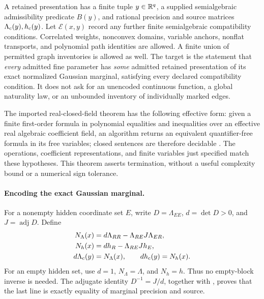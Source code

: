 A retained presentation has a finite tuple \(y\in\mathbb R^q\), a supplied
semialgebraic admissibility predicate \(B(y)\), and rational precision and
source matrices \(\Lambda_{\rm c}(y),h_{\rm c}(y)\). Let \(\mathcal E(x,y)\)
record any further finite semialgebraic compatibility conditions.
Correlated weights, nonconvex domains, variable anchors, nonflat
transports, and polynomial path identities are allowed. A finite union
of permitted graph inventories is allowed as well. The target is the
statement that \emph{every} admitted fine parameter has \emph{some}
admitted retained presentation of its exact normalized Gaussian marginal,
satisfying every declared compatibility condition. It does not ask for
an unencoded continuous function, a global naturality law, or an
unbounded inventory of individually marked edges.

The imported real-closed-field theorem has the following effective form:
given a finite first-order formula in polynomial equalities and
inequalities over an effective real algebraic coefficient field, an
algorithm returns an equivalent quantifier-free formula in its free
variables; closed sentences are therefore decidable
\cite[Sec.~6]{CohenMahboubi2012}. The operations, coefficient
representations, and finite variables just specified match these
hypotheses. This theorem asserts termination, without a useful complexity
bound or a numerical sign tolerance.

\paragraph{Encoding the exact Gaussian marginal.}
For a nonempty hidden coordinate set \(E\), write
\(D=\Lambda_{EE}\), \(d=\det D>0\), and \(J=\operatorname{adj}D\).
Define
\begin{equation}
\begin{aligned}
N_\Lambda(x)&=d\Lambda_{RR}-\Lambda_{RE}J\Lambda_{ER},\\
N_h(x)&=dh_R-\Lambda_{RE}Jh_E,\\
d\Lambda_{\rm c}(y)&=N_\Lambda(x),\qquad
dh_{\rm c}(y)=N_h(x).
\end{aligned}
\label{eq:cg-semialgebraic-schur}
\end{equation}
For an empty hidden set, use \(d=1\), \(N_\Lambda=\Lambda\),
and \(N_h=h\). Thus no empty-block inverse is needed.
The adjugate identity \(D^{-1}=J/d\), together with
, proves that the last line
is exactly equality of marginal precision and source.

